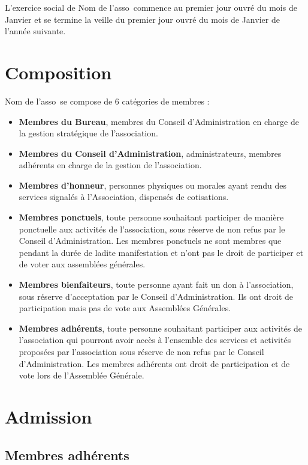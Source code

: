 \documentclass[12pt]{article}
\newcommand{\asso}{Nom de l'asso}
\begin{document}
L’exercice social de \asso~commence au premier jour ouvré du mois de Janvier et se termine la veille du
premier jour ouvré du mois de Janvier de l’année suivante.

\section{Composition}
\label{sec:composition}

\asso~se compose de 6 catégories de membres :

\begin{itemize}
    \item \textbf{Membres du Bureau}, membres du Conseil d’Administration en charge de la gestion stratégique de l’association.
    \item \textbf{Membres du Conseil d’Administration}, administrateurs, membres adhérents en charge de la gestion de l’association.
    \item \textbf{Membres d’honneur}, personnes physiques ou morales ayant rendu des services signalés à l’Association, dispensés de cotisations.
    \item \textbf{Membres ponctuels}, toute personne souhaitant participer de manière ponctuelle aux activités de l’association, sous réserve de non refus par le Conseil d’Administration. Les membres ponctuels ne sont membres que pendant la durée de ladite manifestation et n’ont pas le droit de participer et de voter aux assemblées générales.
    \item \textbf{Membres bienfaiteurs}, toute personne ayant fait un don à l’association, sous réserve d’acceptation par le Conseil d’Administration. Ils ont droit de participation mais pas de vote aux Assemblées Générales.
    \item \textbf{Membres adhérents}, toute personne souhaitant participer aux activités de l’association qui pourront avoir accès à l’ensemble des services et activités proposées par l’association sous réserve de non refus par le Conseil d’Administration. Les membres adhérents ont droit de participation et de vote lors de l’Assemblée Générale.
\end{itemize}



\section{Admission}
\label{sec:admission}

\subsection{Membres adhérents}
\label{sec:admission:adhérents}
\end{document}
